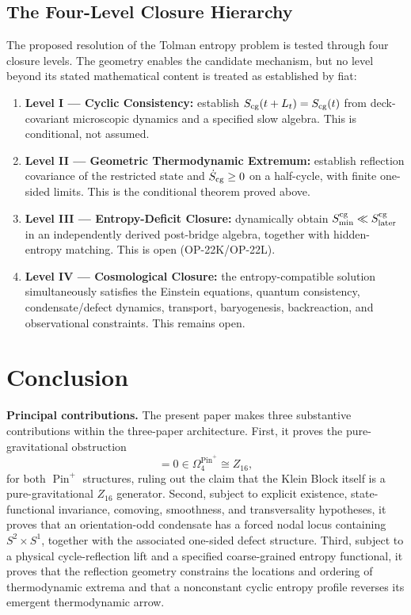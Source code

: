 \documentclass[11pt]{article}
\theoremstyle{canonmath}
\theoremstyle{canonpostulate}
\theoremstyle{canonclaim}
\providecommand{\Klein}{\mathcal{K}}
\providecommand{\Pin}{\operatorname{Pin}}
\def\mathbb#1{#1}%
\def\mathcal#1{#1}%
\begin{document}
\subsection*{The Four-Level Closure Hierarchy}
The proposed resolution of the Tolman entropy problem is tested through four closure levels. The geometry enables the candidate mechanism, but no level beyond its stated mathematical content is treated as established by fiat:
\begin{enumerate}
    \item \textbf{Level I --- Cyclic Consistency:} establish $S_{\rm cg}(t+L_t)=S_{\rm cg}(t)$ from deck-covariant microscopic dynamics and a specified slow algebra. This is conditional, not assumed.
    \item \textbf{Level II --- Geometric Thermodynamic Extremum:} establish reflection covariance of the restricted state and $\dot S_{\rm cg}\ge0$ on a half-cycle, with finite one-sided limits. This is the conditional theorem proved above.
    \item \textbf{Level III --- Entropy-Deficit Closure:} dynamically obtain $S_{\min}^{\rm cg}\ll S_{\rm later}^{\rm cg}$ in an independently derived post-bridge algebra, together with hidden-entropy matching. This is open (OP-22K/OP-22L).
    \item \textbf{Level IV --- Cosmological Closure:} the entropy-compatible solution simultaneously satisfies the Einstein equations, quantum consistency, condensate/defect dynamics, transport, baryogenesis, backreaction, and observational constraints. This remains open.
\end{enumerate}

\newpage
\section{Conclusion}

\textbf{Principal contributions.} The present paper makes three substantive contributions within the three-paper architecture. First, it proves the pure-gravitational obstruction
\begin{equation}
[\Klein,P_{\Pin^+}]=0\in\Omega_4^{\Pin^+}\cong\mathbb Z_{16},
\end{equation}
for both $\Pin^+$ structures, ruling out the claim that the Klein Block itself is a pure-gravitational $\mathbb Z_{16}$ generator. Second, subject to explicit existence, state-functional invariance, comoving, smoothness, and transversality hypotheses, it proves that an orientation-odd condensate has a forced nodal locus containing $S^2\times S^1$, together with the associated one-sided defect structure. Third, subject to a physical cycle-reflection lift and a specified coarse-grained entropy functional, it proves that the reflection geometry constrains the locations and ordering of thermodynamic extrema and that a nonconstant cyclic entropy profile reverses its emergent thermodynamic arrow.
\end{document}
